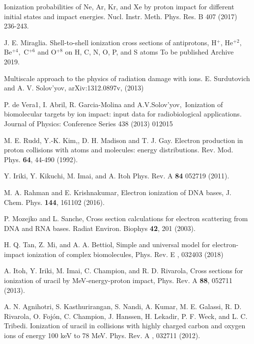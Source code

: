 \documentclass[preprint]{revtex4-2}
\begin{document}
\begin{thebibliography}{99}
Ionization probabilities of Ne, Ar, Kr, and Xe by
proton impact for different initial states and impact energies. 
Nucl. Instr. Meth. Phys. Res. B 407 (2017) 236-243.

J. E. Miraglia. Shell-to-shell ionization cross
sections of antiprotons, H$^{+}$, He$^{+2},$ Be$^{+4},$ C$^{+6}$ and 
O$^{+8}$ on H, C, N, O, P, and S atoms To be published Archive 2019.


Multiscale approach to the physics of radiation
damage with ions. E. Surdutovich and A. V. Solov'yov, 
arXiv:1312.0897v, (2013)

P. de Vera1, I. Abril, R. Garcia-Molina and
A.V.Solov'yov,\ Ionization of biomolecular targets by ion impact: input data
for radiobiological applications. 
Journal of Physics: Conference Series 438
(2013) 012015

M. E. Rudd, Y.-K. Kim,, D. H. Madison and T. J. Gay.
Electron production in proton collisions with atoms and molecules: energy
distributions. 
Rev. Mod. Phys. \textbf{64}, 44-490 (1992).



Y. Iriki, Y. Kikuchi, M. Imai, and A. Itoh
Phys. Rev. A \textbf{84} 052719 (2011).

M. A. Rahman and E. Krishnakumar,
Electron ionization of DNA bases,
J. Chem. Phys. \textbf{144}, 161102 (2016).

P. Mozejko and L. Sanche, 
Cross section calculations for electron scattering from DNA and RNA bases.
Radiat Environ. Biophys \textbf{42}, 201 (2003).

H. Q. Tan, Z. Mi, and A. A. Bettiol, 
Simple and universal model for electron-impact ionization of complex 
biomolecules, 
Phys. Rev. E , 032403 (2018)

A. Itoh, Y. Iriki, M. Imai, C. Champion, and R. D. Rivarola, 
Cross sections for ionization of uracil by MeV-energy-proton impact, 
Phys. Rev. A \textbf{88}, 052711 (2013).


A. N. Agnihotri, S. Kasthurirangan, S. Nandi, A.
Kumar, M. E. Galassi, R. D. Rivarola, O. Foj\'{o}n, C. Champion, J. Hanssen,
H. Lekadir, P. F. Weck, and L. C. Tribedi. 
Ionization of uracil in collisions with highly charged carbon and oxygen 
ions of energy 100 keV to 78 MeV. 
Phys. Rev. A , 032711 (2012).


\end{thebibliography}
\end{document}
